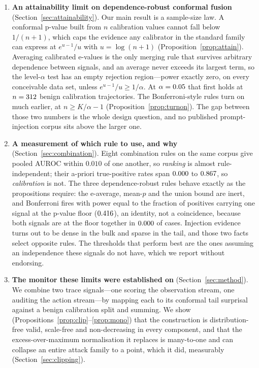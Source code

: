 \documentclass[pdflatex,sn-basic]{sn-jnl}%
\theoremstyle{thmstyleone}
\theoremstyle{thmstyletwo}
\theoremstyle{thmstylethree}
\begin{document}
\begin{enumerate}
\item \textbf{An attainability limit on dependence-robust conformal fusion}
(Section~\ref{sec:attainability}). Our main result is a sample-size law.
A conformal p-value built from $n$ calibration values cannot fall below
$1/(n{+}1)$, which caps the evidence any calibrator in the standard family can
express at $e^{u-1}/u$ with $u = \log(n{+}1)$
(Proposition~\ref{prop:attain}). Averaging calibrated e-values is the only merging
rule that survives arbitrary dependence between signals, and an average never
exceeds its largest term, so the level-$\alpha$ test has an empty rejection
region---power exactly zero, on every conceivable data set, unless
$e^{u-1}/u \ge 1/\alpha$. At $\alpha = 0.05$ that first holds at
$n = 312$ benign calibration trajectories. The Bonferroni-style rules turn on
much earlier, at $n \ge K/\alpha - 1$ (Proposition~\ref{prop:turnon}). The gap
between those two numbers is the whole design question, and no published
prompt-injection corpus sits above the larger one.

\item \textbf{A measurement of which rule to use, and why}
(Section~\ref{sec:combination}). Eight combination rules on the same corpus give
pooled AUROC within $0.010$ of one another, so \emph{ranking} is almost
rule-independent; their a-priori true-positive rates span
$0.000$ to $0.867$, so \emph{calibration} is not. The three
dependence-robust rules behave exactly as the propositions require: the e-average,
mean-$p$ and the union bound are inert, and Bonferroni fires with power equal to
the fraction of positives carrying one signal at the p-value floor
($0.416$), an identity, not a coincidence, because both signals are at the
floor together in $0.000$ of cases. Injection evidence turns out to be dense
in the bulk and sparse in the tail, and those two facts select opposite rules. The
thresholds that perform best are the ones assuming an independence these signals
do not have, which we report without endorsing.

\item \textbf{The monitor these limits were established on}
(Section~\ref{sec:method}). We combine two trace signals---one scoring the
observation stream, one auditing the action stream---by mapping each to its
conformal tail surprisal against a benign calibration split and summing. We show
(Propositions~\ref{prop:clip}--\ref{prop:mono}) that the construction is
distribution-free valid, scale-free and non-decreasing in every component, and
that the excess-over-maximum normalisation it replaces is many-to-one and can
collapse an entire attack family to a point, which it did, measurably
(Section~\ref{sec:clipping}).


\end{enumerate}
\end{document}
